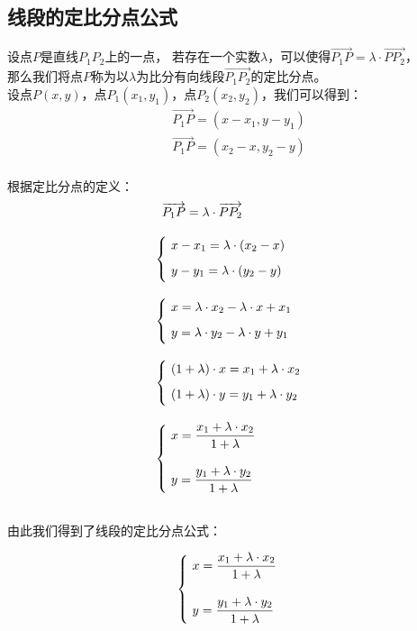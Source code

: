 \documentclass[UTF8]{ctexart}
\begin{document}
\newpage

\subsection{线段的定比分点公式}
    设点$P$是直线$P_1P_2$上的一点，
    若存在一个实数$\lambda$，可以使得$\overrightarrow{P_1P}=\lambda\cdot\overrightarrow{PP_2}$，\\[2mm]
    那么我们将点$P$称为以$\lambda$为比分有向线段$\overrightarrow{P_1P_2}$的定比分点。\\[5mm]
    设点$P(x,y)$，点$P_1(x_1,y_1)$，点$P_2(x_2,y_2)$，我们可以得到：
    \setcounter{equation}{0}
    \begin{align}
        &\overrightarrow{P_1P}=(x-x_1,y-y_1)\\[3mm]
        &\overrightarrow{P_1P}=(x_2-x,y_2-y)
    \end{align}\\
    根据定比分点的定义：
    \begin{align}
        &~~\overrightarrow{P_1P}=\lambda\cdot\overrightarrow{PP_2}\\[3mm]
        &\begin{cases}
            ~x-x_1=\lambda\cdot(x_2-x)\\[2mm]
            ~y-y_1=\lambda\cdot(y_2-y)\vspace{2pt}
        \end{cases}\\[3mm]
        &\begin{cases}
            ~x=\lambda\cdot x_2-\lambda\cdot x+x_1\\[2mm]
            ~y=\lambda\cdot y_2-\lambda\cdot y+y_1\vspace{2pt}
        \end{cases}\\[3mm]
        &\begin{cases}
            ~(1+\lambda)\cdot x=x_1+\lambda\cdot x_2\\[2mm]
            ~(1+\lambda)\cdot y=y_1+\lambda\cdot y_2\vspace{2pt}
        \end{cases}\\[3mm]
        &\begin{cases}
            ~x=\dfrac{x_1+\lambda\cdot x_2}{1+\lambda}\\[6mm]
            ~y=\dfrac{y_1+\lambda\cdot y_2}{1+\lambda}\vspace{2pt}
        \end{cases}
    \end{align}\\[1mm]
    由此我们得到了线段的定比分点公式：\vspace{5pt}
    \begin{large}
        \begin{equation*}
            \begin{cases}
                ~x=\dfrac{x_1+\lambda\cdot x_2}{1+\lambda}\\[6mm]
                ~y=\dfrac{y_1+\lambda\cdot y_2}{1+\lambda}\vspace{2pt}
            \end{cases}
        \end{equation*}
    \end{large}
\end{document}

